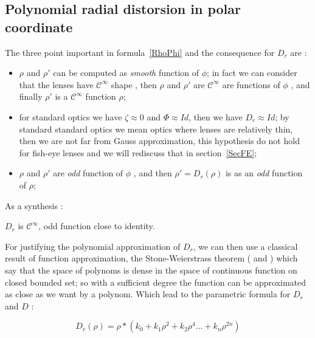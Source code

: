 \subsection{Polynomial radial distorsion in polar coordinate}

The three point important in formula~\ref{RhoPhi} and the consequence for $D_r$  are :

\begin{itemize}
   \item $\rho$ and $\rho'$ can be computed as \emph{smooth} function of $\phi$; in fact we can 
         consider that the lenses have $\mathcal{C}^{\infty}$ shape ,  then   $\rho$ and $\rho'$ 
         are $\mathcal{C}^{\infty}$ are functions of $\phi$ , and finally $\rho'$ is a 
         $\mathcal{C}^{\infty}$ function $\rho$;

   \item for standard optics we have  $\zeta \approx 0$ and $\Phi \approx Id$,  then we have $D_r \approx Id$;
         by standard standard optics we mean optics where lenses are relatively thin, then  we are not far from Gauss approximation,
         this hypothesis do not hold for fish-eye lenses and we will rediscuss that in section~\ref{SecFE};

   \item $\rho$ and $\rho'$ are  \emph{odd}  function of $\phi$ , and then $\rho'=D_r(\rho)$ is as an \emph{odd}  function of 
        $\rho$;

\end{itemize}

As a synthesis :

\begin{proposal} \;
\label{DrHyp}
       $D_r$ is $\mathcal{C}^{\infty}$, odd function close to identity.
\end{proposal}

For justifying the polynomial approximation of $D_r$, we can then use a classical result of function 
approximation, the Stone-Weierstrass theorem (\cite{Weierstrass1885} and \cite{Stone1937})
which say that the space of polynoms is dense in the space of continuous function on closed bounded set;
so with a sufficient degree the function can be approximated as close as we want by a polynom.
Which lead to the parametric formula for $D_r$ and $D$ :

\begin{equation}
	D_r(\rho)  =   \rho  * (k_0 + k_1 \rho^ 2 + k_2 \rho^4 \dots  + k_n \rho^{2n})
\end{equation}

